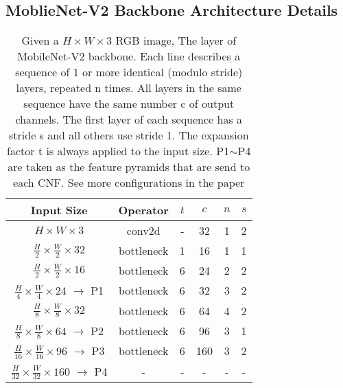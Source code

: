 \documentclass[journal]{IEEEtran}
\begin{document}
\subsection{MoblieNet-V2 Backbone Architecture Details}
\begin{table}[h]
\label{mobilenetv2_backbone}
	\caption{Given a $H\times W\times 3$ RGB image, The layer of MobileNet-V2 backbone. Each line describes a sequence
		of 1 or more identical (modulo stride) layers, repeated
		n times. All layers in the same sequence have the same
		number c of output channels. The first layer of each
		sequence has a stride s and all others use stride 1. The expansion
		factor t is always applied to the input size. P1$\sim$P4 are taken as the feature pyramids that are send to each CNF. See more configurations in the paper \cite{Sandler2018MobileNetV2IR}}
	\centering
\begin{tabular}{c|c|c|c|c|c}
		\toprule[0.2em]
		Input Size & Operator                           & $t$& $c$ & $n$ & $s$\\
		\toprule[0.2em]
		$H\times W \times 3$ &    conv2d                  					&  - &  								32 & 1 & 2\\
		$\frac{H}{2} \times \frac{W}{2} \times 32  $ 						&    bottleneck    		&  1 & 16   &1 & 1\\
		$\frac{H}{2} \times \frac{W}{2}\times16$ 							&   bottleneck    		 		&  6 & 24   &2 &2\\
		$\frac{H}{4} \times \frac{W}{4}\times24$ $\rightarrow$ P1&   bottleneck     		   &  6 & 32   & 3    & 2\\
		$\frac{H}{8} \times \frac{W}{8}\times32$ 							& bottleneck       			 &  6 & 64   &  4 &2 \\
		$\frac{H}{8} \times \frac{W}{8}\times64$ $\rightarrow$ P2&    bottleneck 				&  6 & 96   &3 & 1 \\
		$\frac{H}{16} \times \frac{W}{16}\times96$ $\rightarrow$ P3&    bottleneck    		  &  6 & 160  &3  & 2 \\
		$\frac{H}{32} \times \frac{W}{32}\times160$ $\rightarrow$ P4&    -        &  - & -  & - & - \\

		\toprule[0.2em]
	\end{tabular}
\end{table}
\end{document}

